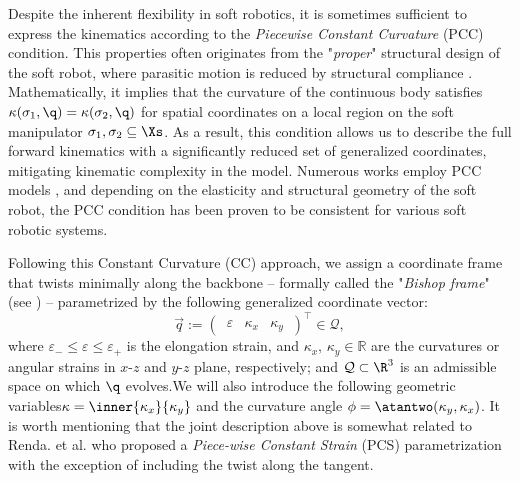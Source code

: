 \begin{asm}
\label{asm:C2:pcc}
Despite the inherent flexibility in soft robotics, it is sometimes sufficient to express the kinematics according to the \emph{Piecewise Constant Curvature} (PCC) condition. \editl This properties often originates from the "\textit{proper}" structural design of the soft robot, where parasitic motion is reduced by structural compliance \editr. Mathematically, it implies that the curvature of the continuous body satisfies $\kappa(\sigma_1,\q) = \kappa(\sigma_2,\q)$ for spatial coordinates on a local region on the soft manipulator $\sigma_1,\sigma_2 \subseteq \Xs$. As a result, this condition allows us to describe the full forward kinematics with a significantly reduced set of generalized coordinates, mitigating kinematic complexity in the model. Numerous works employ PCC models \cite{Falkenhahn2015,Katzschmann2019,Tatlicioglu2007,Marchese2016,Godage2016,DellaSantina2020a}, and depending on the elasticity \editl and structural geometry of the soft robot\editr, the PCC condition has been proven to be consistent for various soft robotic systems.
\end{asm}
%
{Following this Constant Curvature (CC) approach, we assign a coordinate frame that twists minimally along the backbone -- formally called the "\textit{Bishop frame}" (see \cite{Bishop1975}) -- parametrized by the following generalized coordinate vector:}
%
\begin{equation}
\vec{q} := \begin{pmatrix}
\,\varepsilon & \kappa_x & \kappa_y\,
\end{pmatrix}^\top \in \mathcal{Q},
\label{eq:C2:coordinate}
\end{equation}
%
\noindent where $\varepsilon_{-} \le \varepsilon \le \varepsilon_{+}$ is the elongation strain, and $\kappa_x,\,\kappa_y\in\mathbb{R}$ are the curvatures or angular strains in $x$-$z$ and $y$-$z$ plane, respectively; and $\mathcal{Q} \subset \R^3$ is an admissible space on which $\q$ evolves.\editl We will also introduce the following geometric variables\editr $\kappa = \inner{\kappa_x}{\kappa_y}$ and the curvature angle $\phi = \atantwo(\kappa_y,\kappa_x)$. It is worth mentioning that the joint description above is somewhat related to Renda. et al. \cite{Renda2018} who proposed a \emph{Piece-wise Constant Strain} (PCS) parametrization with the exception of including the twist along the tangent.

